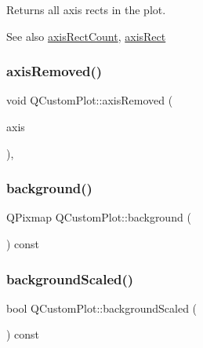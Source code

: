 Returns all axis rects in the plot.

\begin{DoxySeeAlso}{See also}
\mbox{\hyperlink{class_q_custom_plot_a8f85940aaac50efb466287d9d2d04ec6}{axis\+Rect\+Count}}, \mbox{\hyperlink{class_q_custom_plot_ae5eefcb5f6ca26689b1fd4f6e25b42f9}{axis\+Rect}} 
\end{DoxySeeAlso}
\mbox{\label{class_q_custom_plot_a8b46607021c463c94709d3504951cb47}} 
\subsubsection{\texorpdfstring{axisRemoved()}{axisRemoved()}}
{\footnotesize\ttfamily void Q\+Custom\+Plot\+::axis\+Removed (\begin{DoxyParamCaption}\item[{\mbox{\hyperlink{class_q_c_p_axis}{Q\+C\+P\+Axis}} $\ast$}]{axis }\end{DoxyParamCaption})\hspace{0.3cm}{\ttfamily [protected]}, {\ttfamily [virtual]}}

\mbox{\label{class_q_custom_plot_a5b9bbc838cb856e31b39c050fad49f9a}} 
\subsubsection{\texorpdfstring{background()}{background()}}
{\footnotesize\ttfamily Q\+Pixmap Q\+Custom\+Plot\+::background (\begin{DoxyParamCaption}{ }\end{DoxyParamCaption}) const\hspace{0.3cm}{\ttfamily [inline]}}

\mbox{\label{class_q_custom_plot_aac96f3a0f5070228ed13602976886b80}} 
\subsubsection{\texorpdfstring{backgroundScaled()}{backgroundScaled()}}
{\footnotesize\ttfamily bool Q\+Custom\+Plot\+::background\+Scaled (\begin{DoxyParamCaption}{ }\end{DoxyParamCaption}) const\hspace{0.3cm}{\ttfamily [inline]}}

